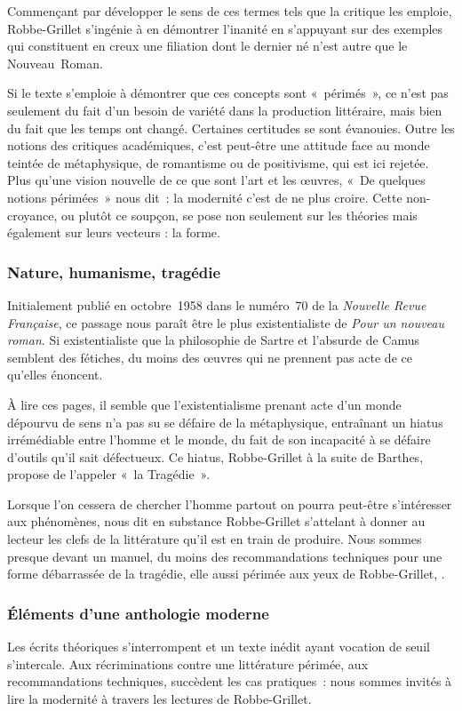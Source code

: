 \documentclass[12pt, a4paper]{article}
\begin{document}
Commençant par développer le sens de ces termes tels que la critique les emploie, Robbe-Grillet s'ingénie à en démontrer l'inanité en s'appuyant sur des exemples qui constituent en creux une filiation dont le dernier né n'est autre que le Nouveau~Roman.

Si le texte s'emploie à démontrer que ces concepts sont «~périmés~», ce n'est pas seulement du fait d'un besoin de variété dans la production littéraire, mais bien du fait que les temps ont changé. Certaines certitudes se sont évanouies. Outre les notions des critiques académiques, c'est peut-être une attitude face au monde teintée de métaphysique, de romantisme ou de positivisme, qui est ici rejetée. Plus qu'une vision nouvelle de ce que sont l'art et les œuvres, «~De quelques notions périmées~» nous dit~: la modernité c'est de ne plus croire. Cette non-croyance, ou plutôt ce soupçon, se pose non seulement sur les théories mais également sur leurs vecteurs : la forme.


\subsubsection{Nature, humanisme, tragédie}
Initialement publié en octobre~1958 dans le numéro~70 de la \textit{Nouvelle Revue Française}, ce passage nous paraît être le plus existentialiste de \textit{Pour un nouveau roman}. Si existentialiste que la philosophie de Sartre et l'absurde de Camus semblent des fétiches, du moins des œuvres qui ne prennent pas acte de ce qu'elles énoncent.

À lire ces pages, il semble que l'existentialisme prenant acte d'un monde dépourvu de sens n'a pas su se défaire de la métaphysique, entraînant un hiatus irrémédiable entre l'homme et le monde, du fait de son incapacité à se défaire d'outils qu'il sait défectueux. Ce hiatus, Robbe-Grillet à la suite de Barthes, propose de l'appeler «~la Tragédie~».

Lorsque l'on cessera de chercher l'homme partout on pourra peut-être s'intéresser aux phénomènes, nous dit en substance Robbe-Grillet s'attelant à donner au lecteur les clefs de la littérature qu'il est en train de produire. Nous sommes presque devant un manuel, du moins des recommandations techniques pour une forme débarrassée de la tragédie, elle aussi périmée aux yeux de Robbe-Grillet, .

\subsubsection{Éléments d'une anthologie moderne}
Les écrits théoriques s'interrompent et un texte inédit ayant vocation de seuil s'intercale. Aux récriminations contre une littérature périmée, aux recommandations techniques, succèdent les cas pratiques~: nous sommes invités à lire la modernité à travers les lectures de Robbe-Grillet.
\end{document}
